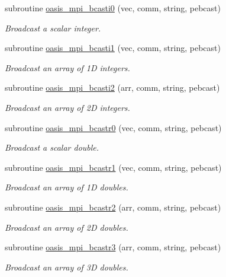 \begin{DoxyCompactItemize}
subroutine \hyperlink{interfacemod__oasis__mpi_1_1oasis__mpi__bcast_a773c919f8d2e8e9f5684d8ab474adf67}{oasis\+\_\+mpi\+\_\+bcasti0} (vec, comm, string, pebcast)
\begin{DoxyCompactList}\small\item\em Broadcast a scalar integer. \end{DoxyCompactList}\item 
subroutine \hyperlink{interfacemod__oasis__mpi_1_1oasis__mpi__bcast_a55099ffd2a5c5395e84381aac600f925}{oasis\+\_\+mpi\+\_\+bcasti1} (vec, comm, string, pebcast)
\begin{DoxyCompactList}\small\item\em Broadcast an array of 1\+D integers. \end{DoxyCompactList}\item 
subroutine \hyperlink{interfacemod__oasis__mpi_1_1oasis__mpi__bcast_a37a7d70970597e2482d9972e2eec30fb}{oasis\+\_\+mpi\+\_\+bcasti2} (arr, comm, string, pebcast)
\begin{DoxyCompactList}\small\item\em Broadcast an array of 2\+D integers. \end{DoxyCompactList}\item 
subroutine \hyperlink{interfacemod__oasis__mpi_1_1oasis__mpi__bcast_af36d9d1af755437ac9291e95cf75b1b2}{oasis\+\_\+mpi\+\_\+bcastr0} (vec, comm, string, pebcast)
\begin{DoxyCompactList}\small\item\em Broadcast a scalar double. \end{DoxyCompactList}\item 
subroutine \hyperlink{interfacemod__oasis__mpi_1_1oasis__mpi__bcast_a0e0e3c41f07c25b5b9d6f0f452eb0178}{oasis\+\_\+mpi\+\_\+bcastr1} (vec, comm, string, pebcast)
\begin{DoxyCompactList}\small\item\em Broadcast an array of 1\+D doubles. \end{DoxyCompactList}\item 
subroutine \hyperlink{interfacemod__oasis__mpi_1_1oasis__mpi__bcast_a83b3e5f67615db7af2bd599a067c7691}{oasis\+\_\+mpi\+\_\+bcastr2} (arr, comm, string, pebcast)
\begin{DoxyCompactList}\small\item\em Broadcast an array of 2\+D doubles. \end{DoxyCompactList}\item 
subroutine \hyperlink{interfacemod__oasis__mpi_1_1oasis__mpi__bcast_aec70b77613425bddc9002f1dc21db1d2}{oasis\+\_\+mpi\+\_\+bcastr3} (arr, comm, string, pebcast)
\begin{DoxyCompactList}\small\item\em Broadcast an array of 3\+D doubles. \end{DoxyCompactList}\end{DoxyCompactItemize}


